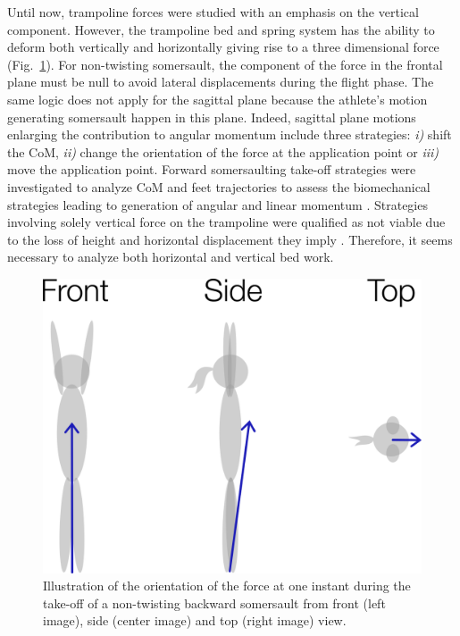 Until now, trampoline forces were studied with an emphasis on the vertical component.
However, the trampoline bed and spring system has the ability to deform both vertically and horizontally giving rise to a three dimensional force (Fig.~\ref{fig:Visu_force_ori}).
For non-twisting somersault, the component of the force in the frontal plane must be null to avoid lateral displacements during the flight phase.
The same logic does not apply for the sagittal plane because the athlete's motion 
generating somersault happen in this plane.
Indeed, sagittal plane motions enlarging the contribution to angular momentum include three strategies: \textit{i)} shift the CoM, \textit{ii)} change the orientation of the force at the application point or \textit{iii)} move the application point.
Forward somersaulting take-off strategies were investigated to analyze CoM and feet trajectories to assess the biomechanical strategies leading to generation of angular and linear momentum \cite{lephartatiner}.
Strategies involving solely vertical force on the trampoline were qualified as not viable due to the loss of height and horizontal displacement they imply \cite{lephartatiner}.
Therefore, it seems necessary to analyze both horizontal and vertical bed work.

\begin{figure}[h!]
\centering
\includegraphics[width=0.8\linewidth]{figures/Visu_force_ori.png}
\caption{Illustration of the orientation of the force at one instant during the take-off of a non-twisting backward somersault from front (left image), side (center image) and top (right image) view.}
\label{fig:Visu_force_ori}
\end{figure}

